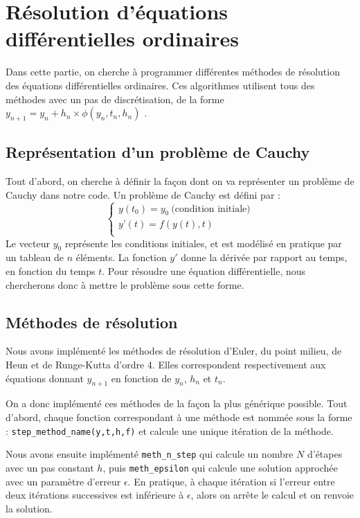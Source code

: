 \section{Résolution d'équations différentielles ordinaires}

Dans cette partie, on cherche à programmer différentes méthodes de résolution
des équations différentielles ordinaires.
Ces algorithmes utilisent tous des méthodes avec un pas de discrétisation, de la forme
$y_{n+1}=y_n+h_n \times \phi (y_n,t_n,h_n)$ .

\subsection{Représentation d'un problème de Cauchy}
Tout d'abord, on cherche à définir la façon dont on va représenter
un problème de Cauchy dans notre code. Un problème de Cauchy est défini par :
\begin{equation}
	\begin{cases}
		y(t_0)=y_0 ~\text{(condition initiale)}\\
		y’(t)=f(y(t),t) \\
	\end{cases}    
\end{equation}
Le vecteur $y_0$ représente les conditions initiales, et est modélisé en pratique par un tableau de $n$ éléments.
La fonction $y'$ donne la dérivée par rapport au temps, en fonction du temps $t$.
Pour résoudre une équation différentielle, nous chercherons donc à mettre le problème sous cette forme.

\subsection{Méthodes de résolution}
Nous avons implémenté les méthodes de résolution d’Euler, du point milieu, de Heun et de Runge-Kutta d’ordre 4.
Elles correspondent respectivement aux équations donnant $y_{n+1}$ en fonction de $y_n$, $h_n$ et $t_n$.

On a donc implémenté ces méthodes de la façon la plus générique possible. Tout d'abord, 
chaque fonction correspondant à une méthode est nommée sous la forme : \texttt{step\_method\_name(y,t,h,f)} et calcule
une unique itération de la méthode.

Nous avons ensuite implémenté \texttt{meth\_n\_step} qui calcule un nombre $N$ d'étapes avec un pas constant $h$,
puis \texttt{meth\_epsilon} qui calcule une solution approchée avec un paramètre d’erreur $\epsilon$.
En pratique, à chaque itération si l'erreur entre deux itérations successives est inférieure à $\epsilon$,
alors on arrête le calcul et on renvoie la solution.

